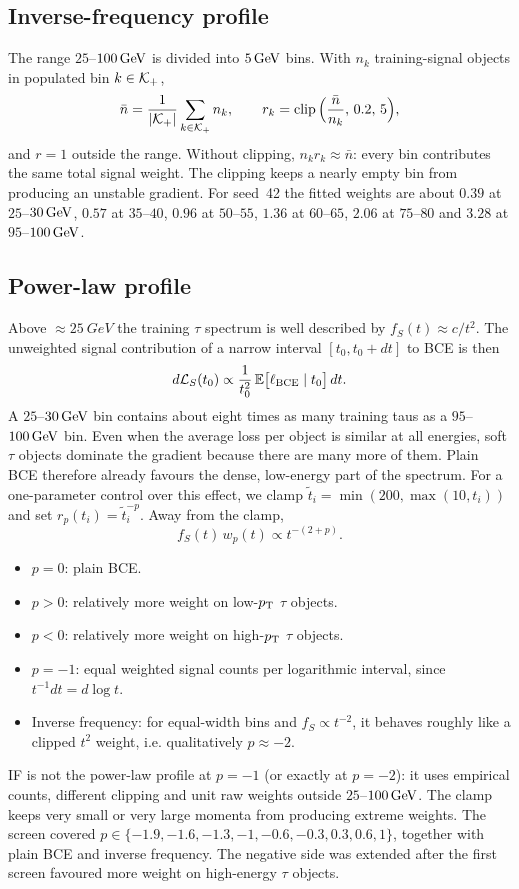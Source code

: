\subsection{Inverse-frequency profile}
The range $25$--$100\,\mathrm{GeV}$ is divided into $5\,\mathrm{GeV}$ bins. With $n_k$ training-signal objects in populated bin $k\in\mathcal{K}_+$,
\begin{equation}
  \bar n=\frac{1}{|\mathcal{K}_+|}\sum_{k\in\mathcal{K}_+}n_k,\qquad r_k=\operatorname{clip}\Big(\frac{\bar n}{n_k},\,0.2,\,5\Big),
\end{equation}
and $r=1$ outside the range. Without clipping, $n_kr_k\approx\bar n$: every bin contributes the same total signal weight. The clipping keeps a nearly empty bin from producing an unstable gradient. For seed~42 the fitted weights are about $0.39$ at $25$--$30\,\mathrm{GeV}$, $0.57$ at $35$--$40$, $0.96$ at $50$--$55$, $1.36$ at $60$--$65$, $2.06$ at $75$--$80$ and $3.28$ at $95$--$100\,\mathrm{GeV}$.

\subsection{Power-law profile}
Above $\approx\SI{25}{GeV}$ the training $\tau$ spectrum is well described by $f_S(t)\approx c/t^2$. The unweighted signal contribution of a narrow interval $[t_0,t_0+dt]$ to BCE is then
\begin{equation}
  d\mathcal{L}_S(t_0)\propto\frac{1}{t_0^2}\,\mathbb{E}\big[\ell_{\mathrm{BCE}}\mid t_0\big]\,dt .
\end{equation}
A $25$--$30\,\mathrm{GeV}$ bin contains about eight times as many training taus as a $95$--$100\,\mathrm{GeV}$ bin. Even when the average loss per object is similar at all energies, soft $\tau$ objects dominate the gradient because there are many more of them. Plain BCE therefore already favours the dense, low-energy part of the spectrum. For a one-parameter control over this effect, we clamp $\tilde t_i=\min(200,\max(10,t_i))$ and set $r_p(t_i)=\tilde t_i^{-p}$. Away from the clamp,
\begin{equation}
  f_S(t)\,w_p(t)\propto t^{-(2+p)} .
\end{equation}
\begin{itemize}
  \item $p=0$: plain BCE.
  \item $p>0$: relatively more weight on low-$p_{\mathrm{T}}$ $\tau$ objects.
  \item $p<0$: relatively more weight on high-$p_{\mathrm{T}}$ $\tau$ objects.
  \item $p=-1$: equal weighted signal counts per logarithmic interval, since $t^{-1}dt=d\log t$.
  \item Inverse frequency: for equal-width bins and $f_S\propto t^{-2}$, it behaves roughly like a clipped $t^{2}$ weight, i.e. qualitatively $p\approx-2$.
\end{itemize}
IF is not the power-law profile at $p=-1$ (or exactly at $p=-2$): it uses empirical counts, different clipping and unit raw weights outside $25$--$100\,\mathrm{GeV}$. The clamp keeps very small or very large momenta from producing extreme weights. The screen covered $p\in\{-1.9,-1.6,-1.3,-1,-0.6,-0.3,0.3,0.6,1\}$, together with plain BCE and inverse frequency. The negative side was extended after the first screen favoured more weight on high-energy $\tau$ objects.

